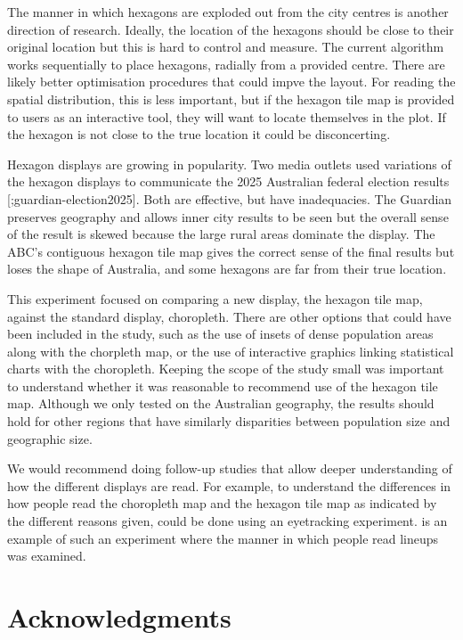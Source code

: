 \documentclass[
doublespace,
  times]{anzsauth}
\begin{document}
The manner in which hexagons are exploded out from the city centres is
another direction of research. Ideally, the location of the hexagons
should be close to their original location but this is hard to control
and measure. The current algorithm works sequentially to place hexagons,
radially from a provided centre. There are likely better optimisation
procedures that could impve the layout. For reading the spatial
distribution, this is less important, but if the hexagon tile map is
provided to users as an interactive tool, they will want to locate
themselves in the plot. If the hexagon is not close to the true location
it could be disconcerting.

Hexagon displays are growing in popularity. Two media outlets used
variations of the hexagon displays to communicate the 2025 Australian
federal election results
{[}\citet{abc-election2025};guardian-election2025{]}. Both are
effective, but have inadequacies. The Guardian preserves geography and
allows inner city results to be seen but the overall sense of the result
is skewed because the large rural areas dominate the display. The ABC's
contiguous hexagon tile map gives the correct sense of the final results
but loses the shape of Australia, and some hexagons are far from their
true location.

This experiment focused on comparing a new display, the hexagon tile
map, against the standard display, choropleth. There are other options
that could have been included in the study, such as the use of insets of
dense population areas along with the chorpleth map, or the use of
interactive graphics linking statistical charts with the choropleth.
Keeping the scope of the study small was important to understand whether
it was reasonable to recommend use of the hexagon tile map. Although we
only tested on the Australian geography, the results should hold for
other regions that have similarly disparities between population size
and geographic size.

We would recommend doing follow-up studies that allow deeper
understanding of how the different displays are read. For example, to
understand the differences in how people read the choropleth map and the
hexagon tile map as indicated by the different reasons given, could be
done using an eyetracking experiment. \citet{ZCHMR} is an example of
such an experiment where the manner in which people read lineups was
examined.

\section*{Acknowledgments}\label{acknowledgments}
\end{document}
